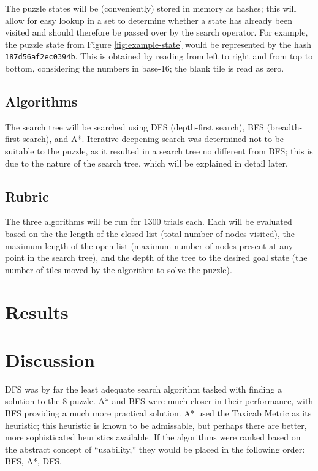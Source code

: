 \documentclass{article}
\begin{document}
    The puzzle states will be (conveniently) stored in memory as hashes; this
    will allow for easy lookup in a set to determine whether a state has already
    been visited and should therefore be passed over by the search operator.
    For example, the puzzle state from Figure \ref{fig:example-state} would
    be represented by the hash \texttt{187d56af2ec0394b}. This is obtained
    by reading from left to right and from top to bottom, considering the
    numbers in base-16; the blank tile is read as zero.

  \subsection*{Algorithms}
    The search tree will be searched using DFS (depth-first search), BFS
    (breadth-first search), and A*. Iterative deepening search was determined
    not to be suitable to the puzzle, as it resulted in a search tree no
    different from BFS; this is due to the nature of the search tree, which will
    be explained in detail later.

  \subsection*{Rubric}
    The three algorithms will be run for 1300 trials each. Each will be
    evaluated based on the the length of the closed list (total number of nodes
    visited), the maximum length of the open list (maximum number of nodes
    present at any point in the search tree), and the depth of the tree to the
    desired goal state (the number of tiles moved by the algorithm to solve the
    puzzle).

\pagebreak
\section*{Results}
  

\section*{Discussion}
  DFS was by far the least adequate search algorithm tasked with finding a
  solution to the 8-puzzle. A* and BFS were much closer in their performance,
  with BFS providing a much more practical solution. A* used the Taxicab Metric
  as its heuristic; this heuristic is known to be admissable, but perhaps there
  are better, more sophisticated heuristics available. If the algorithms
  were ranked based on the abstract concept of ``usability,'' they would be
  placed in the following order: BFS, A*, DFS.
\end{document}
